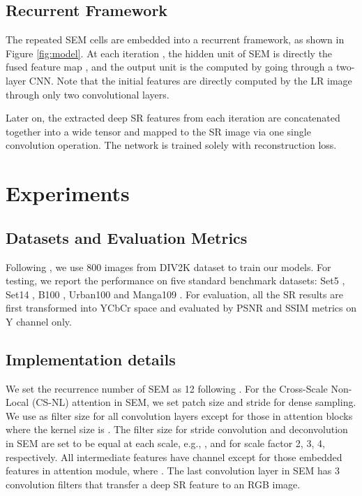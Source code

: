 \documentclass[10pt,twocolumn,letterpaper]{article}
\begin{document}
 \subsection{Recurrent Framework}
The repeated SEM cells are embedded into a recurrent framework, as shown in Figure \ref{fig:model}. At each iteration , the hidden unit  of SEM is directly the fused feature map , and the output unit  is the computed by  going through a two-layer CNN. Note that the initial features  are directly computed by the LR image  through only two convolutional layers.   







Later on, the extracted deep SR features  from each iteration  are concatenated together into a wide tensor and mapped to the SR image  via one single convolution operation. The network is trained solely with  reconstruction loss.


%
 

 
\section{Experiments}
\subsection{Datasets and Evaluation Metrics}
Following \cite{lim2017enhanced,zhang2019residual,zhang2018residual}, we use 800 images from DIV2K \cite{timofte2017ntire} dataset to train our models. For testing,  we report the performance on five standard benchmark datasets: Set5 \cite{bevilacqua2012low}, Set14 \cite{zeyde2010single}, B100 \cite{martin2001database}, Urban100 \cite{huang2015single} and Manga109 \cite{matsui2017sketch}. For evaluation, all the SR results are first transformed into YCbCr space and evaluated by PSNR and SSIM \cite{wang2004image} metrics
on Y channel only.

\subsection{Implementation details}
We set the recurrence number of SEM as 12 following \cite{liu2018non}. For the Cross-Scale Non-Local (CS-NL) attention in SEM, we set patch size  and stride  for dense sampling. We use  as filter size for all convolution layers except for those in attention blocks where the kernel size is . The filter size for stride convolution and deconvolution in SEM are set to be equal at each scale, e.g., ,  and  for scale factor 2, 3, 4, respectively. All intermediate features have channel  except for those embedded features in attention module, where . The last convolution layer in SEM has 3 convolution filters that transfer a deep SR feature to an RGB image. 
\end{document}
